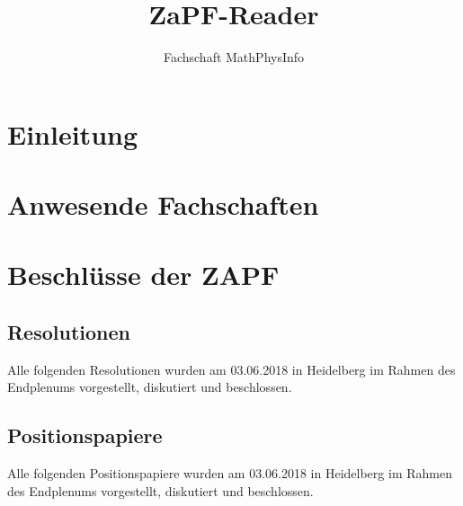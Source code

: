 \documentclass[ngerman, twoside, 10pt, openany, a5paper]{scrbook}
\begin{document}
\sloppy

\title{ZaPF-Reader}
\author{Fachschaft MathPhysInfo}
\maketitle



\newpage
\setcounter{tocdepth}{1} %
\normalsize

\dominitoc
\tableofcontents
\thispagestyle{empty}

\emptychapter

\chapter{Einleitung}
  

\chapter{Anwesende Fachschaften}
  

\tocchapter

\chapter{Beschlüsse der ZAPF}
  \label{chap:reso}
  \section{Resolutionen}
    Alle folgenden Resolutionen wurden am 03.06.2018 in Heidelberg im Rahmen des Endplenums
    vorgestellt, diskutiert und beschlossen.
      
      
      
      
      
      
      
      
      

  \newpage
  \section{Positionspapiere}
    Alle folgenden Positionspapiere wurden am 03.06.2018 in Heidelberg im Rahmen des Endplenums
    vorgestellt, diskutiert und beschlossen.
      
      
      
\end{document}
